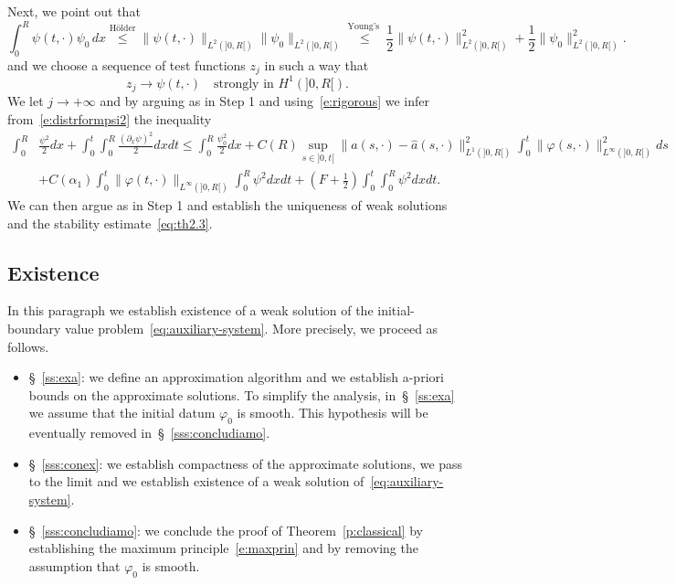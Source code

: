 \documentclass[11pt,leqno]{amsart}
\numberwithin{equation}{section}
\begin{document}
Next, we point out that 
\begin{equation}
\label{e:rigorous}
  \int_0^R \psi(t, \cdot)  \psi_0 \, dx \stackrel{\text{H\"older}}{\leq}
  \| \psi (t, \cdot) \|_{L^2 (]0, R[)}
   \| \psi_0  \|_{L^2 (]0, R[)}
   \stackrel{\text{Young's }}{\leq}
   \frac{1}{2}  \| \psi (t, \cdot) \|^2_{L^2 (]0, R[)}
   + \frac{1}{2}  \| \psi_0  \|^2_{L^2 (]0, R[)}. 
\end{equation}
and we choose a sequence of test functions $z_j$ in such a way that
$$
    z_j \to \psi (t, \cdot) \quad \text{strongly in $H^1(]0, R[)$.}
$$
We let $j \to + \infty$ and by arguing as in {\sc Step 1} and using~\eqref{e:rigorous} we infer from~\eqref{e:distrformpsi2} the inequality
\begin{equation*}
\begin{split}
      \int_0^R &
 \frac{\psi^2}{2} dx + \int_0^t \!  \! \int_0^R \frac{({\partial_x } \psi)^2}{2}  dx dt
 \leq 
  \int_0^R 
 \frac{\psi_0^2}{2} dx  
 +  C(R)  
 \sup_{s \in ]0, t[ } \| a (s, \cdot) - \hat a (s, \cdot)  \|^2_{L^1 (]0, R[)}  
   \int_0^t   \| {\varphi} (s, \cdot) \|^2_{L^\infty (]0, R[)} ds \\
   & + C(\alpha_1)
   \int_0^t  \| {\varphi} (t, \cdot) \|_{L^\infty (]0, R[)} 
   \int_0^R \psi^2 dx dt +
   \left( F + \frac{1}{2} \right) \int_0^t \! \! \int_0^R \psi^2 dx dt.
\end{split}
\end{equation*}
We can then argue as in {\sc Step 1} and establish the uniqueness of weak solutions and the stability estimate~\eqref{eq:th2.3}.
\subsection{Existence}
\label{ss:exi}
In this paragraph we establish existence of a weak solution of the initial-boundary value problem~\eqref{eq:auxiliary-system}. More precisely, we proceed as follows. 
\begin{itemize}
\item \S~\ref{ss:exa}: we define an approximation algorithm and 
we establish a-priori bounds on the approximate solutions. To simplify the analysis, in~\S~\ref{ss:exa} we assume that the initial datum ${\varphi}_0$ is smooth. This hypothesis will be eventually removed in~\S~\ref{sss:concludiamo}. 
\item \S~\ref{sss:conex}: we establish compactness of the approximate solutions, we pass to the limit and we establish existence of a weak solution of~\eqref{eq:auxiliary-system}. 
\item \S~\ref{sss:concludiamo}: we conclude the proof of Theorem~\ref{p:classical} by establishing the maximum principle~\eqref{e:maxprin} and by removing the assumption that ${\varphi}_0$ 
is smooth. 
\end{itemize}
\end{document}

